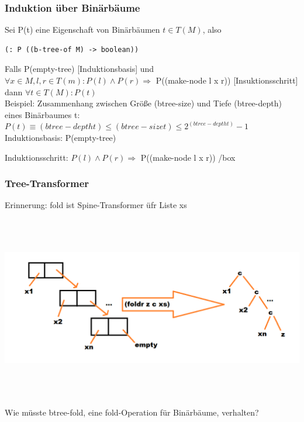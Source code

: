 \documentclass[paper=a4, fontsize=11pt]{scrartcl}
\numberwithin{equation}{section}
\numberwithin{figure}{section}
\numberwithin{table}{section}
\begin{document}
\begin{lstlistig}
\subsubsection{Induktion über Binärbäume}
Sei P(t) eine Eigenschaft von Binärbäumen $t \in T(M)$, also 
\begin{lstlisting}
(: P ((b-tree-of M) -> boolean))
\end{lstlisting}
Falls P(empty-tree) [Induktionsbasis] und $\forall x \in M,l,r \in T(m): P(l) \wedge P(r) \Rightarrow$ P((make-node l x r)) [Insuktionsschritt] dann $\forall t \in T(M): P(t)$ \\

Beispiel: Zusammenhang zwischen Größe (btree-size) und Tiefe (btree-depth) eines Binärbaumes t: \\

$P(t) \equiv (btree-depth t) \leq (btree-size t) \leq 2^{(btree-depth t)} -1$ \\

Induktionsbasis: P(empty-tree)

Induktionsschritt: $P(l) \wedge P(r) \Rightarrow$ P((make-node l x r))
\hfill /box

\subsubsection{Tree-Transformer}
Erinnerung: fold ist Spine-Transformer üfr Liste xs

\includegraphics[width=15cm,height=8cm]{foldr.png}

Wie müsste btree-fold, eine fold-Operation für Binärbäume, verhalten? \\


\end{lstlistig}
\end{document}
